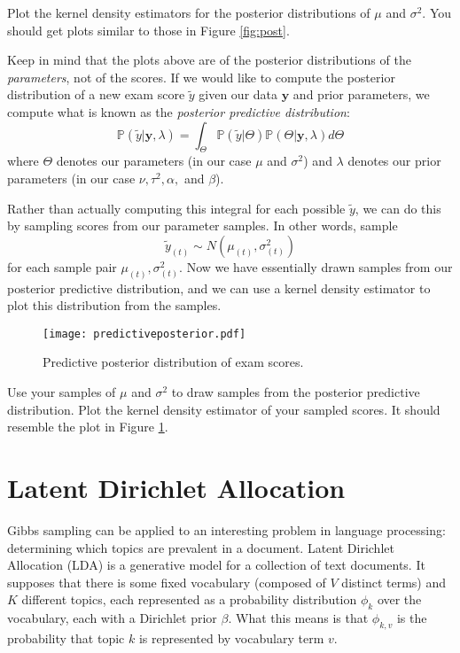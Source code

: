 \begin{problem}
Plot the kernel density estimators for the posterior distributions of $\mu$ and $\sigma^{2}$.
You should get plots similar to those in Figure \ref{fig:post}.
\end{problem}

Keep in mind that the plots above are of the posterior distributions of the \emph{parameters}, not of the scores. If we would like to compute the posterior distribution of a new exam score $\tilde{y}$ given our data $\mathbf{y}$ and prior parameters, we compute what is known as the \emph{posterior predictive distribution}:
\begin{equation*}
\mathbb{P}(\tilde{y} | \mathbf{y}, \lambda) = \int_{\Theta} \mathbb{P}(\tilde{y} | \Theta)\mathbb{P}(\Theta | \mathbf{y}, \lambda) d\Theta
\end{equation*}
where $\Theta$ denotes our parameters (in our case $\mu$ and $\sigma^{2}$) and $\lambda$ denotes our prior parameters (in our case $\nu, \tau^{2}, \alpha,$ and $\beta$).

Rather than actually computing this integral for each possible $\tilde{y}$, we can do this by sampling scores from our parameter samples. In other words, sample
\begin{equation*}
\tilde{y}_{(t)} \sim N(\mu_{(t)}, \sigma_{(t)}^{2})
\end{equation*}
for each sample pair $\mu_{(t)}, \sigma_{(t)}^{2}$. Now we have essentially drawn samples from our posterior predictive distribution, and we can use a kernel density estimator to plot this distribution from the samples.

\begin{figure}
\texttt{[image: predictiveposterior.pdf]}
\caption{Predictive posterior distribution of exam scores.}
\label{fig:predictive}
\end{figure}

\begin{problem}
Use your samples of $\mu$ and $\sigma^{2}$ to draw samples from the posterior predictive distribution. Plot the kernel density estimator of your sampled scores.
It should resemble the plot in Figure \ref{fig:predictive}.
\end{problem}

\section*{Latent Dirichlet Allocation}
Gibbs sampling can be applied to an interesting problem in language processing: determining which topics are prevalent in a document.
Latent Dirichlet Allocation (LDA) is a generative model for a collection of text documents.
It supposes that there is some fixed vocabulary (composed of $V$ distinct terms) and $K$ different topics, each represented as a probability distribution $\phi_{k}$ over the vocabulary, each with a Dirichlet prior $\beta$.
What this means is that $\phi_{k,v}$ is the probability that topic $k$ is represented by vocabulary term $v$.

